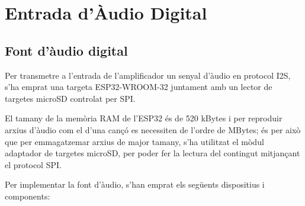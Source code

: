 \chapter{Entrada d'Àudio Digital}
\section{Font d'àudio digital}
\par Per transmetre a l'entrada de l'amplificador un senyal d'àudio en protocol I2S, s'ha emprat una targeta ESP32-WROOM-32 juntament amb un lector de targetes microSD controlat per SPI. 
 \par El tamany de la memòria RAM de l'ESP32 és de 520 kBytes i per reproduir arxius d'àudio com el d'una cançó es necessiten de l'ordre de MBytes; és per això que per emmagatzemar arxius de major tamany, s'ha utilitzat el mòdul adaptador de targetes microSD, per poder fer la lectura del contingut mitjançant el protocol SPI.
 \par Per implementar la font d'àudio, s'han emprat els següents dispositius i components:
